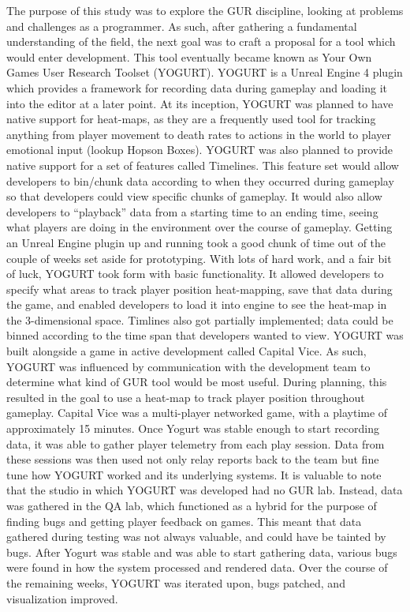 \documentclass[journal]{IEEEtran}
\begin{document}
The purpose of this study was to explore the GUR discipline, looking at problems and challenges as a programmer. As such, after gathering a fundamental understanding of the field, the next goal was to craft a proposal for a tool which would enter development. This tool eventually became known as Your Own Games User Research Toolset (YOGURT). YOGURT is a Unreal Engine 4 plugin which provides a framework for recording data during gameplay and loading it into the editor at a later point. At its inception, YOGURT was planned to have native support for heat-maps, as they are a frequently used tool for tracking anything from player movement to death rates to actions in the world to player emotional input (lookup Hopson Boxes). YOGURT was also planned to provide native support for a set of features called Timelines. This feature set would allow developers to bin/chunk data according to when they occurred during gameplay so that developers could view specific chunks of gameplay. It would also allow developers to “playback” data from a starting time to an ending time, seeing what players are doing in the environment over the course of gameplay.
Getting an Unreal Engine plugin up and running took a good chunk of time out of the couple of weeks set aside for prototyping. With lots of hard work, and a fair bit of luck, YOGURT took form with basic functionality. It allowed developers to specify what areas to track player position heat-mapping, save that data during the game, and enabled developers to load it into engine to see the heat-map in the 3-dimensional space. Timlines also got partially implemented; data could be binned according to the time span that developers wanted to view.
YOGURT was built alongside a game in active development called Capital Vice. As such, YOGURT was influenced by communication with the development team to determine what kind of GUR tool would be most useful. During planning, this resulted in the goal to use a heat-map to track player position throughout gameplay. Capital Vice was a multi-player networked game, with a playtime of approximately 15 minutes. Once Yogurt was stable enough to start recording data, it was able to gather player telemetry from each play session. Data from these sessions was then used not only relay reports back to the team but fine tune how YOGURT worked and its underlying systems. It is valuable to note that the studio in which YOGURT was developed had no GUR lab. Instead, data was gathered in the QA lab, which functioned as a hybrid for the purpose of finding bugs and getting player feedback on games. This meant that data gathered during testing was not always valuable, and could have be tainted by bugs.
After Yogurt was stable and was able to start gathering data, various bugs were found in how the system processed and rendered data. Over the course of the remaining weeks, YOGURT was iterated upon, bugs patched, and visualization improved.
\end{document}
